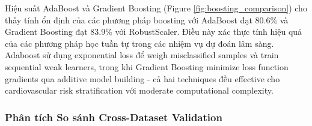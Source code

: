 Hiệu suất AdaBoost và Gradient Boosting (Figure \ref{fig:boosting_comparison}) cho thấy tính ổn định của các phương pháp boosting với AdaBoost đạt 80.6\% và Gradient Boosting đạt 83.9\% với RobustScaler. Điều này xác thực tính hiệu quả của các phương pháp học tuần tự trong các nhiệm vụ dự đoán lâm sàng. Adaboost sử dụng exponential loss để weigh misclassified samples và train sequential weak learners, trong khi Gradient Boosting minimize loss function gradients qua additive model building - cả hai techniques đều effective cho cardiovascular risk stratification với moderate computational complexity.

\subsubsection{Phân tích So sánh Cross-Dataset Validation}

